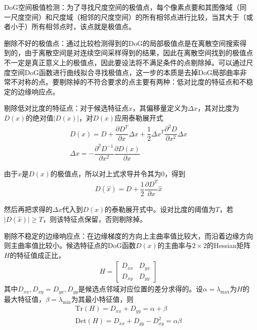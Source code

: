 \documentclass[supercite]{HustGraduPaper}
\begin{document}
\begin{sloppypar}
\begin{appendices}
    {\heiti  DoG空间极值检测：}为了寻找尺度空间的极值点，每个像素点要和其图像域（同一尺度空间）和尺度域（相邻的尺度空间）的所有相邻点进行比较，当其大于（或者小于）所有相邻点时，该点就是极值点。

    {\heiti  删除不好的极值点：}通过比较检测得到的DoG的局部极值点是在离散空间搜索得到的，由于离散空间是对连续空间采样得到的结果，因此在离散空间找到的极值点不一定是真正意义上的极值点，因此要设法将不满足条件的点剔除掉。可以通过尺度空间DoG函数进行曲线拟合寻找极值点，这一步的本质是去掉DoG局部曲率非常不对称的点。要剔除掉的不符合要求的点主要有两种：低对比度的特征点和不稳定的边缘响应点。

    {\heiti 剔除低对比度的特征点：}对于候选特征点$x$，其偏移量定义为$\Delta x$，其对比度为$D(x)$的绝对值$\lvert D(x) \rvert$，对$D(x)$应用泰勒展开式\begin{gather}
      D(x)=D+\dfrac{\partial D^T}{\partial x}\Delta x+\dfrac{1}{2}\Delta x^T\dfrac{\partial^2 D}{\partial x^2}\Delta x\\
      \Delta x=-\dfrac{\partial^2 D^{-1}}{\partial x^2}\dfrac{\partial D(x)}{\partial x}
    \end{gather}
    
    由于$x$是$D(x)$的极值点，所以对上式求导并令其为0，得到\begin{gather}
      D(\hat{x})=D+\dfrac{1}{2}\dfrac{\partial D^T}{\partial x}\hat{x}
    \end{gather}

    然后再把求得的$\Delta x$代入到$D(x)$的泰勒展开式中。设对比度的阈值为$T$，若$\lvert D(\hat{x}) \rvert\geq T$，则该特征点保留，否则剔除掉。

    {\heiti 剔除不稳定的边缘响应点：}在边缘梯度的方向上主曲率值比较大，而沿着边缘方向则主曲率值比较小。候选特征点的DoG函数$D(x)$的主曲率与$2\times 2$的Hessian矩阵$H$的特征值成正比，\begin{gather}
     H=\begin{bmatrix}
        D_{xx}&D_{yx}\\
        D_{xy}&D_{yy}
     \end{bmatrix}
    \end{gather}
    其中$D_{xx},D_{xy}=D_{yx},D_{yy}$是候选点邻域对应位置的差分求得的。设$\alpha=\lambda_{\text{max}}$为$H$的最大特征值，$\beta=\lambda_{\text{min}}$为其最小特征值，则\begin{gather}
      \text{Tr}(H)=D_{xx}+D_{yy}=\alpha+\beta\\
      \text{Det}(H)=D_{xx}+D_{yy}-D^2_{xy}=\alpha\beta
    \end{gather}
    

\end{appendices}
\end{sloppypar}
\end{document}
